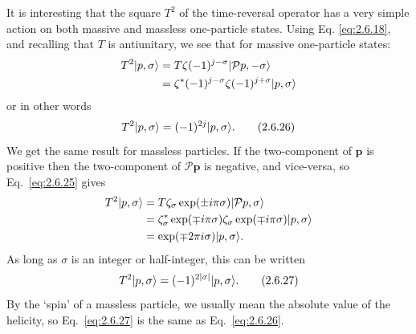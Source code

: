 It is interesting that the square $T^2$ of the time-reversal operator has a
very simple action on both massive and massless one-particle states. Using Eq.
\eqref{eq:2.6.18}, and recalling that $T$ is antiunitary, we see that for massive
one-particle states:
\[
\begin{aligned}
T^2\lvert p,\sigma\rangle
&=T\zeta(-1)^{j-\sigma}\lvert \mathcal{P}p,-\sigma\rangle\\
&=\zeta^*(-1)^{j-\sigma}\zeta(-1)^{j+\sigma}\lvert p,\sigma\rangle
\end{aligned}
\]
or in other words
\begin{equation}
T^2\lvert p,\sigma\rangle=(-1)^{2j}\lvert p,\sigma\rangle.
\tag{2.6.26}\label{eq:2.6.26}
\end{equation}
We get the same result for massless particles. If the two-component of
$\mathbf{p}$ is positive then the two-component of $\mathcal{P}\mathbf{p}$ is
negative, and vice-versa, so Eq.~\eqref{eq:2.6.25} gives
\[
\begin{aligned}
T^2\lvert p,\sigma\rangle
&=T\zeta_\sigma\exp(\pm i\pi\sigma)
  \lvert \mathcal{P}p,\sigma\rangle\\
&=\zeta_\sigma^*\exp(\mp i\pi\sigma)
  \zeta_\sigma\exp(\mp i\pi\sigma)\lvert p,\sigma\rangle\\
&=\exp(\mp2\pi i\sigma)\lvert p,\sigma\rangle.
\end{aligned}
\]
As long as $\sigma$ is an integer or half-integer, this can be written
\begin{equation}
T^2\lvert p,\sigma\rangle=(-1)^{2|\sigma|}\lvert p,\sigma\rangle.
\tag{2.6.27}\label{eq:2.6.27}
\end{equation}
By the `spin' of a massless particle, we usually mean the absolute value of
the helicity, so Eq.~\eqref{eq:2.6.27} is the same as Eq.~\eqref{eq:2.6.26}.

